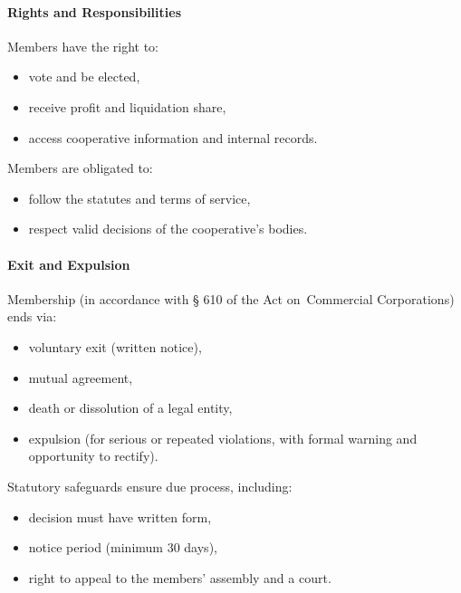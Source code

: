 \paragraph{Rights and Responsibilities}
Members have the right to:
\begin{itemize}
    \item vote and be elected,
    \item receive profit and liquidation share,
    \item access cooperative information and internal records.
\end{itemize}
Members are obligated to:
\begin{itemize}
    \item follow the statutes and terms of service,
    \item respect valid decisions of the cooperative’s bodies.
\end{itemize}

\paragraph{Exit and Expulsion}
Membership (in accordance with § 610 of the Act on~Commercial Corporations) ends via:
\begin{itemize}
    \item voluntary exit (written notice),
    \item mutual agreement,
    \item death or dissolution of a legal entity,
    \item expulsion (for serious or repeated violations, with formal warning and opportunity to rectify).
\end{itemize}

Statutory safeguards ensure due process, including:
\begin{itemize}
    \item decision must have written form,
    \item notice period (minimum 30 days),
    \item right to appeal to the members’ assembly and a court.
\end{itemize}

